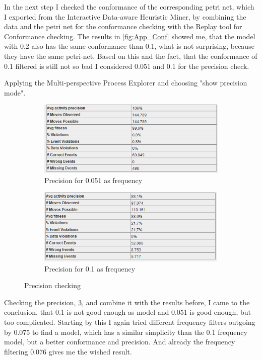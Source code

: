 In the next step I checked the conformance of the corresponding petri net, which I exported from the Interactive Data-aware Heuristic Miner, by combining the data and the petri net for the conformance checking with the Replay tool for Conformance checking. 
The results in \ref{fig:App_Conf} showed me, that the model with 0.2 also has the same conformance than 0.1, what is not surprising, because they have the same petri-net. Based on this and the fact, that the conformance of 0.1 filtered is still not so bad I considered 0.051 and 0.1 for the precision check.

Applying the Multi-perspective Process Explorer and choosing "show precision mode".

\begin{figure}[h]
\centering
\begin{subfigure}{.49\textwidth}
  \centering
  \includegraphics[width=\linewidth]{App_Precision0-051.PNG}
  \caption{Precision for 0.051 as frequency}
  \label{fig:APP_Prec0-051}
\end{subfigure}%
\begin{subfigure}{.49\textwidth}
  \centering
  \includegraphics[width=\linewidth]{App_Precision0-1.PNG}
  \caption{Precision for 0.1 as frequency}
  \label{fig:APP_Prec0-1}
\end{subfigure}
\caption{Precision checking}
\label{fig:App_Prec}
\end{figure}

Checking the precision, \ref{fig:App_Prec}, and combine it with the results before, I came to the conclusion, that 0.1 is not good enough as model and 0.051 is good enough, but too complicated. Starting by this I again tried different frequency filters outgoing by 0.075 to find a model, which has a similar simplicity than the 0.1 frequency model, but a better conformance and precision. And already the frequency filtering 0.076 gives me the wished result.

